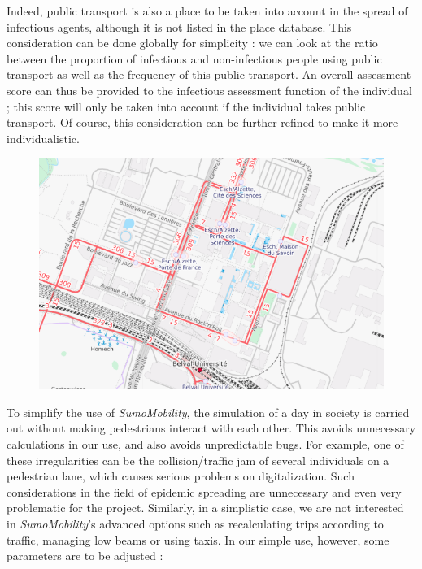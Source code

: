 Indeed, public transport is also a place to be taken into account in the spread of infectious agents, although it is not listed in the place database. This consideration can be done globally for simplicity : we can look at the ratio between the proportion of infectious and non-infectious people using public transport as well as the frequency of this public transport. An overall assessment score can thus be provided to the infectious assessment function of the individual ; this score will only be taken into account if the individual takes public transport. Of course, this consideration can be further refined to make it more individualistic.\\

\begin{figure}[h]
  \centering
  \includegraphics[width=0.8\linewidth]{Media/BelvalOSMTP.png}
  \caption{}
  \label{fig:belvalosmtp}
\end{figure}

To simplify the use of \textit{SumoMobility}, the simulation of a day in society is carried out without making pedestrians interact with each other. This avoids unnecessary calculations in our use, and also avoids unpredictable bugs. For example, one of these irregularities can be the collision/traffic jam of several individuals on a pedestrian lane, which causes serious problems on digitalization. Such considerations in the field of epidemic spreading are unnecessary and even very problematic for the project. Similarly, in a simplistic case, we are not interested in \textit{SumoMobility}'s advanced options such as recalculating trips according to traffic, managing low beams or using taxis. In our simple use, however, some parameters are to be adjusted :\\

